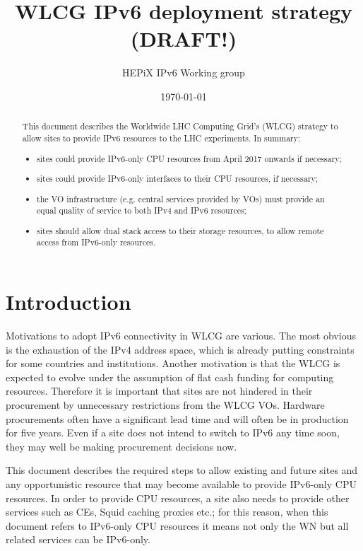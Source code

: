 \documentclass[11pt]{article}
\begin{document}
\title{WLCG IPv6 deployment strategy (DRAFT!)}
\author{HEPiX IPv6 Working group}
\date{\today}
\maketitle

\renewcommand{\abstractname}{Executive Summary}
\begin{abstract}
This document describes the Worldwide LHC Computing Grid's (WLCG) strategy to allow sites to provide IPv6 resources to the LHC experiments. In summary:
\begin{itemize}
\item sites could provide IPv6-only CPU resources from April 2017 onwards if necessary;
\item sites could provide IPv6-only interfaces to their CPU resources, if necessary;
\item the VO infrastructure (e.g. central services provided by VOs) must provide an equal quality of service to both IPv4 and IPv6 resources;
\item sites should allow dual stack access to their storage resources, to allow remote access from IPv6-only resources.
\end{itemize}
\end{abstract}

\newpage
\tableofcontents
\newpage

\section{Introduction}
Motivations to adopt IPv6 connectivity in WLCG are various. The most
obvious is the exhaustion of the IPv4 address space, which is already
putting constraints for some countries and institutions. Another
motivation is that the WLCG is expected to evolve under the assumption
of flat cash funding for computing resources. Therefore it is
important that sites are not hindered in their procurement by
unnecessary restrictions from the WLCG VOs. Hardware procurements
often have a significant lead time and will often be in production for
five years.  Even if a site does not intend to switch to IPv6 any time
soon, they may well be making procurement decisions now.

This document describes the required steps to allow existing and
future sites and any opportunistic resource that may become available
to provide IPv6-only CPU resources. In order to provide CPU resources,
a site also needs to provide other services such as CEs, Squid caching
proxies etc.; for this reason, when this document refers to IPv6-only
CPU resources it means not only the WN but all related services can be
IPv6-only.
\end{document}
